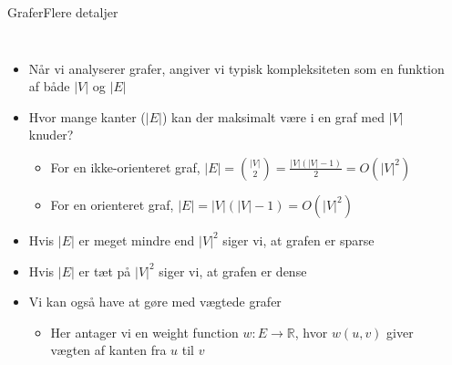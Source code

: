 \documentclass[aspectratio=1610]{beamer}
\begin{document}
\begin{frame}{Grafer}{Flere detaljer}
    \begin{columns}
        \begin{itemize}[<+(1)->]
            \small
            \item Når vi analyserer grafer, angiver vi typisk kompleksiteten som
                en funktion af både $|V|$ og $|E|$
            \item Hvor mange kanter ($|E|$) kan der maksimalt være i en graf med
                $|V|$ knuder?
                \begin{itemize}
                    \item For en ikke-orienteret graf, $|E| = \binom{|V|}{2} =
                        \frac{|V|(|V|-1)}{2} = O(|V|^2)$
                    \item For en orienteret graf, $|E| = |V|(|V|-1) = O(|V|^2)$
                \end{itemize}
            \item Hvis $|E|$ er meget mindre end $|V|^2$ siger vi, at grafen er
                \alert{sparse}
            \item Hvis $|E|$ er tæt på $|V|^2$ siger vi, at grafen er
                \alert{dense}
            \item Vi kan også have at gøre med \alert{vægtede} grafer
                \begin{itemize}
                    \item Her antager vi en \alert{weight function} $w: E
                        \rightarrow \mathbb{R}$, hvor $w(u,v)$ giver vægten af
                        kanten fra $u$ til $v$
                \end{itemize}
        \end{itemize}
    

        \begin{center}


\end{center}
\end{columns}
\end{frame}
\end{document}

